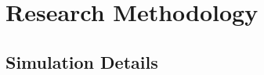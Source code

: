 \documentclass[a4paper,fleqn]{cas-sc}
\begin{document}
\section{Research Methodology}%

\subsection{Simulation Details}
%
%
%
%
%
%
\end{document}
